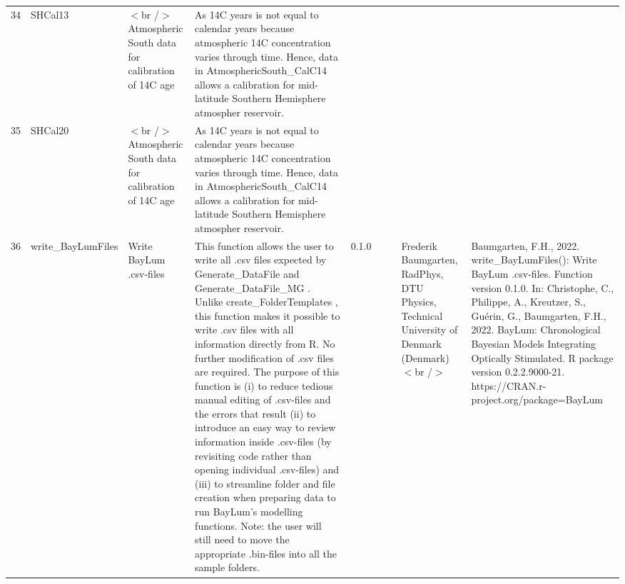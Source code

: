 \begin{table}[ht]
\begin{tabular}{rllllllll}
 \\ 
  34 & SHCal13 & $<$br /$>$ Atmospheric South data for calibration of 14C age  & As 14C years is not equal to calendar years because atmospheric 14C concentration varies through time. Hence, data in AtmosphericSouth\_CalC14 allows a calibration for mid-latitude Southern Hemisphere atmospher reservoir. &  &  &  &  &  \\ 
  35 & SHCal20 & $<$br /$>$ Atmospheric South data for calibration of 14C age  & As 14C years is not equal to calendar years because atmospheric 14C concentration varies through time. Hence, data in AtmosphericSouth\_CalC14 allows a calibration for mid-latitude Southern Hemisphere atmospher reservoir. &  &  &  &  &  \\ 
  36 & write\_BayLumFiles & Write BayLum .csv-files & This function allows the user to write all .csv files expected by Generate\_DataFile  and  Generate\_DataFile\_MG . Unlike  create\_FolderTemplates , this function makes it possible to write .csv files with all information directly from R. No further modification of .csv files are required. The purpose of this function is (i) to reduce tedious manual editing of .csv-files and the errors that result (ii) to introduce an easy way to review information inside .csv-files (by revisiting code rather than opening individual .csv-files) and (iii) to streamline folder and file creation when preparing data to run BayLum's modelling functions. Note: the user will still need to move the appropriate .bin-files into all the sample folders. & 0.1.0
 &  &  & Frederik Baumgarten, RadPhys, DTU Physics, Technical University of Denmark (Denmark)$<$br /$>$ & Baumgarten, F.H., 2022. write\_BayLumFiles(): Write BayLum .csv-files. Function version 0.1.0. In: Christophe, C., Philippe, A., Kreutzer, S., Guérin, G., Baumgarten, F.H., 2022. BayLum: Chronological Bayesian Models Integrating Optically Stimulated. R package version 0.2.2.9000-21. https://CRAN.r-project.org/package=BayLum
 \\ 
   \hline
\end{tabular}
\end{table}

